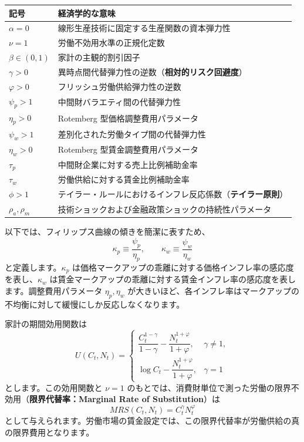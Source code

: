 \documentclass[
  japanese,
  lualatex,
  ja=standard,
  12pt,
  a4paper]{ltjsarticle}
\newcounter{none} %
\begin{document}
{\def\LTcaptype{none} %
\begin{longtable}[]{@{}
  >{\raggedright\arraybackslash}p{}
  >{\raggedright\arraybackslash}p{}@{}}
\toprule\noalign{}
\begin{minipage}[b]{\linewidth}\raggedright
記号
\end{minipage} & \begin{minipage}[b]{\linewidth}\raggedright
経済学的な意味
\end{minipage} \\
\midrule\noalign{}
\endhead
\bottomrule\noalign{}
\endlastfoot
\(\alpha=0\) & 線形生産技術に固定する生産関数の資本弾力性 \\
\(\nu=1\) & 労働不効用水準の正規化定数 \\
\(\beta\in(0,1)\) & 家計の主観的割引因子 \\
\(\gamma>0\) &
異時点間代替弾力性の逆数（\textbf{相対的リスク回避度}） \\
\(\varphi>0\) & フリッシュ労働供給弾力性の逆数 \\
\(\psi_p>1\) & 中間財バラエティ間の代替弾力性 \\
\(\eta_p>0\) & Rotemberg 型価格調整費用パラメータ \\
\(\psi_w>1\) & 差別化された労働タイプ間の代替弾力性 \\
\(\eta_w>0\) & Rotemberg 型賃金調整費用パラメータ \\
\(\tau_p\) & 中間財企業に対する売上比例補助金率 \\
\(\tau_w\) & 労働供給に対する賃金比例補助金率 \\
\(\phi>1\) &
テイラー・ルールにおけるインフレ反応係数（\textbf{テイラー原則}） \\
\(\rho_a,\rho_m\) &
技術ショックおよび金融政策ショックの持続性パラメータ \\
\end{longtable}
}

以下では、フィリップス曲線の傾きを簡潔に表すため、 \[
\kappa_p\equiv\frac{\psi_p}{\eta_p},
\qquad
\kappa_w\equiv\frac{\psi_w}{\eta_w}
\] と定義します。\(\kappa_p\)
は価格マークアップの乖離に対する価格インフレ率の感応度を表し、\(\kappa_w\)
は賃金マークアップの乖離に対する賃金インフレ率の感応度を表します。調整費用パラメータ
\(\eta_p, \eta_w\)
が大きいほど、各インフレ率はマークアップの不均衡に対して緩慢にしか反応しなくなります。

\Needspace{0.18\textheight}

家計の期間効用関数は \[
U(C_t,N_t)
=
\begin{cases}
\dfrac{C_t^{1-\gamma}}{1-\gamma}
-\dfrac{N_t^{1+\varphi}}{1+\varphi},
& \gamma\neq1,\\[6pt]
\log C_t-\dfrac{N_t^{1+\varphi}}{1+\varphi},
& \gamma=1
\end{cases}
\] とします。この効用関数と \(\nu=1\)
のもとでは、消費財単位で測った労働の限界不効用（\textbf{限界代替率：Marginal
Rate of Substitution}）は \[
MRS(C_t,N_t)=C_t^\gamma N_t^\varphi
\]
として与えられます。労働市場の賃金設定では、この限界代替率が労働供給の真の限界費用となります。
\end{document}

